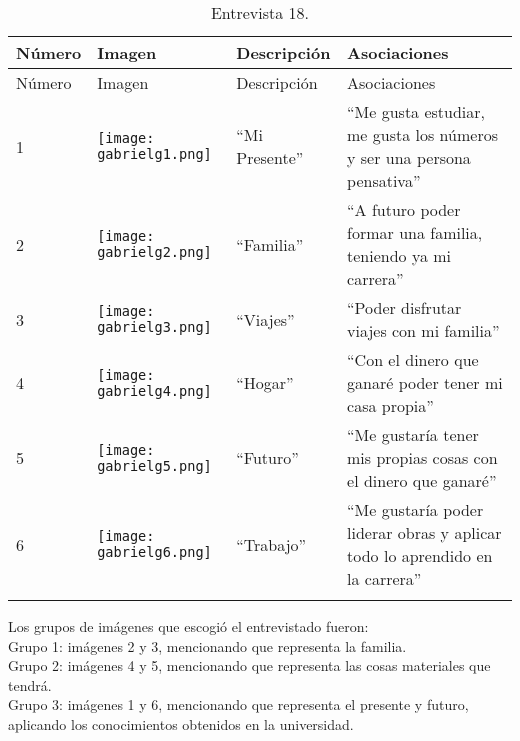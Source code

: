 \begin{longtable}{>{\centering\arraybackslash}m{1cm} >{\centering\arraybackslash}m{2cm} >{\arraybackslash}m{5cm}>{\arraybackslash}m{5cm}}
	
	\hline
	Número & Imagen & Descripción & Asociaciones \\
	\hline \hline
	\endfirsthead
	
	\hline
	Número & Imagen & Descripción & Asociaciones \\
	\hline \hline
	\endhead
		
		1 & \texttt{[image: gabrielg1.png]} & ``Mi Presente'' & ``Me gusta estudiar, me gusta los números y ser una persona pensativa'' \\
		\hline
		
		2 & \texttt{[image: gabrielg2.png]} & ``Familia'' & ``A futuro poder formar una familia, teniendo ya mi carrera'' \\
		\hline
		
		3 & \texttt{[image: gabrielg3.png]} & ``Viajes'' & ``Poder disfrutar viajes con mi familia'' \\
		\hline
		
		4 & \texttt{[image: gabrielg4.png]} & ``Hogar'' & ``Con el dinero que ganaré poder tener mi casa propia'' \\
		\hline
		
		5 & \texttt{[image: gabrielg5.png]} & ``Futuro'' & ``Me gustaría tener mis propias cosas con el dinero que ganaré'' \\
		\hline
		
		6 & \texttt{[image: gabrielg6.png]} & ``Trabajo'' & ``Me gustaría poder liderar obras y aplicar todo lo aprendido en la carrera'' \\
		\hline

	\caption{Entrevista 18.}
	\label{tabla:gabrielg}
\end{longtable}

Los grupos de imágenes que escogió el entrevistado fueron:\\

Grupo 1: imágenes 2 y 3, mencionando que representa la familia. \\

Grupo 2: imágenes 4 y 5, mencionando que representa las cosas materiales que tendrá.\\

Grupo 3: imágenes 1 y 6, mencionando que representa el presente y futuro, aplicando los conocimientos obtenidos en la universidad.\\


